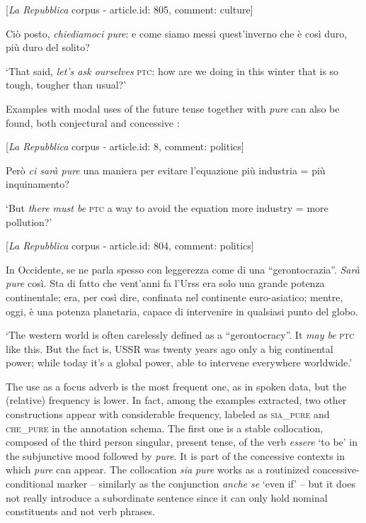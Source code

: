           [\textit{La Repubblica} corpus - article.id: 805, comment: culture]

Ciò posto, \textit{chiediamoci pure}: e come siamo messi quest’inverno che è così duro, più duro del solito?

\glt ‘That said, \textit{let’s ask ourselves} \textsc{ptc}: how are we doing in this winter that is so tough, tougher than usual?’
    \z

Examples with modal uses of the future tense together with \textit{pure} can also be found, both conjectural  and concessive :

\ea%
    \label{ex:key:40}

           [\textit{La Repubblica} corpus - article.id: 8, comment: politics]

Però \textit{ci sarà pure} una maniera per evitare l’equazione più industria = più inquinamento?

\glt ‘But \textit{there must be} \textsc{ptc} a way to avoid the equation more industry = more pollution?’
    \z

\ea%
    \label{ex:key:41}

          [\textit{La Repubblica} corpus - article.id: 804, comment: politics]

In Occidente, se ne parla spesso con leggerezza come di una “gerontocrazia”. \textit{Sarà pure} così. Sta di fatto che vent’anni fa l’Urss era solo una grande potenza continentale; era, per così dire, confinata nel continente euro-asiatico; mentre, oggi, è una potenza planetaria, capace di intervenire in qualsiasi punto del globo.

\glt ‘The western world is often carelessly defined as a “gerontocracy”. It \textit{may be} \textsc{ptc} like this. But the fact is, USSR was twenty years ago only a big continental power; while today it’s a global power, able to intervene everywhere worldwide.’
    \z

The use as a focus adverb is the most frequent one, as in spoken data, but the (relative) frequency is lower. In fact, among the examples extracted, two other constructions appear with considerable frequency, labeled as \textsc{sia\_pure} and \textsc{che\_pure} in the annotation schema. The first one is a stable collocation, composed of the third person singular, present tense, of the verb \textit{essere} ‘to be’ in the subjunctive mood followed by \textit{pure}. It is part of the concessive contexts in which \textit{pure} can appear. The collocation \textit{sia} \textit{pure} works as a routinized concessive-conditional marker – similarly as the conjunction \textit{anche se} ‘even if’ – but it does not really introduce a subordinate sentence since it can only hold nominal constituents and not verb phrases.

